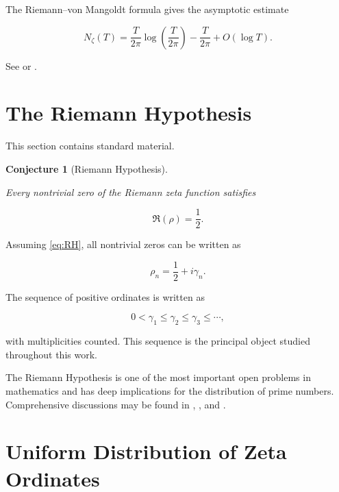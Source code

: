 \documentclass[11pt]{amsart}
\numberwithin{equation}{section}
\theoremstyle{plain}
\newtheorem{conjecture}[theorem]{Conjecture}
\theoremstyle{definition}
\theoremstyle{remark}
\begin{document}
The Riemann--von Mangoldt formula gives the asymptotic estimate

\begin{equation}
N_\zeta(T)
=
\frac{T}{2\pi}
\log\!\left(
\frac{T}{2\pi}
\right)
-
\frac{T}{2\pi}
+
O(\log T).
\label{eq:riemann_von_mangoldt}
\end{equation}

See
\cite{Titchmarsh1986}
or
\cite{Edwards2001}.

\section{The Riemann Hypothesis}
\label{sec:riemann_hypothesis}

This section contains standard material.

\begin{conjecture}[Riemann Hypothesis]
\label{conj:RH}

Every nontrivial zero of the Riemann zeta function satisfies

\begin{equation}
\Re(\rho)
=
\frac12.
\label{eq:RH}
\end{equation}

\end{conjecture}

Assuming
\eqref{eq:RH},
all nontrivial zeros can be written as

\begin{equation}
\rho_n
=
\frac12
+
i\gamma_n.
\label{eq:RH_zeros}
\end{equation}

The sequence of positive ordinates is written as

\begin{equation}
0<\gamma_1
\leq
\gamma_2
\leq
\gamma_3
\leq
\cdots,
\label{eq:gamma_ordering}
\end{equation}

with multiplicities counted. This sequence is the principal object
studied throughout this work.

The Riemann Hypothesis is one of the most important open problems in
mathematics and has deep implications for the distribution of prime
numbers.
Comprehensive discussions may be found in
\cite{Titchmarsh1986},
\cite{Edwards2001},
and
\cite{IwaniecKowalski2004}.

\section{Uniform Distribution of Zeta Ordinates}
\label{sec:uniform_distribution_zeta_ordinates}
\end{document}
